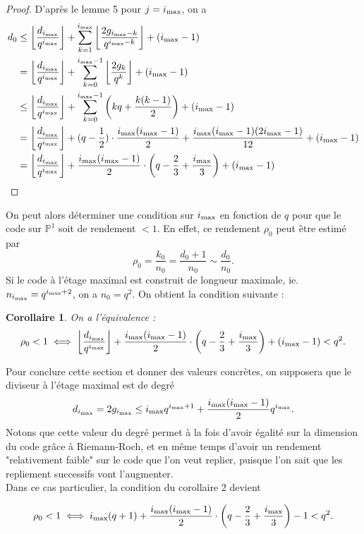 \documentclass[10pt]{article}
\newtheorem{coro1}{Corollaire}[]
\newcommand{\cd}{\cdot}
\newcommand{\ii}{i_{\rm{max}}}
\begin{document}
\begin{proof}
D'après le lemme 5 pour $j=\ii$, on a
\begin{align*}
d_0 &\leq \left\lfloor \dfrac{d_{\ii}}{q^{\ii}}\right\rfloor + \sum\limits_{k=1}^{\ii} \left\lfloor \dfrac{2g_{\ii -k}}{q^{\ii-k}}\right\rfloor + (\ii-1) \\
	&= \left\lfloor \dfrac{d_{\ii}}{q^{\ii}}\right\rfloor + \sum\limits_{k=0}^{\ii-1} \left\lfloor \dfrac{2g_k}{q^k}\right\rfloor + (\ii-1) \\
	& \leq \left\lfloor \dfrac{d_{\ii}}{q^{\ii}}\right\rfloor + \sum\limits_{k=0}^{\ii-1} \left(kq + \dfrac{k(k-1)}{2}\right) + (\ii-1) \\
	&= \left\lfloor \dfrac{d_{\ii}}{q^{\ii}}\right\rfloor + (q-\frac{1}{2}) \cd \dfrac{\ii(\ii-1)}{2} + \dfrac{\ii(\ii-1)(2\ii-1)}{12} + (\ii-1) \\
	&= \left\lfloor \dfrac{d_{\ii}}{q^{\ii}}\right\rfloor + \dfrac{\ii(\ii-1)}{2}\cd \left(q-\frac{2}{3} + \frac{\ii}{3}\right) + (\ii-1) \\
\end{align*}
\end{proof}

On peut alors déterminer une condition sur $\ii$ en fonction de $q$ pour que le code sur $\mathbb{P}^1$ soit de rendement $< 1$. En effet, ce rendement $\rho_0$ peut être estimé par 
\[ \rho_0 = \dfrac{k_0}{n_0} = \dfrac{d_0+1}{n_0} \sim \dfrac{d_0}{n_0}.\]
Si le code à l'étage maximal est construit de longueur maximale, ie. $n_{\ii} = q^{\ii+2}$, on a $n_0=q^2$. On obtient la condition suivante :

\begin{coro1}
On a l'équivalence :
\[ \rho_0 < 1 \iff \left\lfloor \dfrac{d_{\ii}}{q^{\ii}}\right\rfloor + \dfrac{\ii(\ii-1)}{2}\cd \left(q-\frac{2}{3} + \frac{\ii}{3}\right) + (\ii-1) < q^2.\]
\end{coro1}

Pour conclure cette section et donner des valeurs concrètes, on supposera que le diviseur à l'étage maximal est de degré 
\[d_{\ii} = 2g_{\ii} \leq \ii q^{\ii+1} + \dfrac{\ii(\ii-1)}{2}q^{\ii}.\]
Notons que cette valeur du degré permet à la fois d'avoir égalité sur la dimension du code grâce à Riemann-Roch, et en même temps d'avoir un rendement "relativement faible" sur le code que l'on veut replier, puisque l'on sait que les repliement successifs vont l'augmenter. \\
Dans ce cas particulier, la condition du corollaire 2 devient

\[ \rho_0 < 1 \iff \ii(q+1) + \dfrac{\ii(\ii-1)}{2}\cd \left(q-\frac{2}{3} + \frac{\ii}{3}\right) -1 < q^2.\]
\end{document}
